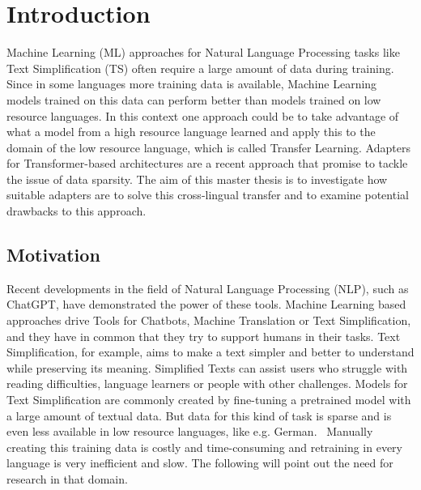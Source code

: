 \section{Introduction}
Machine Learning (ML) approaches for Natural Language Processing tasks like
Text Simplification (TS) often require a large amount of data during training.
Since in some languages more training data is available, Machine Learning models
trained on this data can perform better than models trained on low resource languages.
In this context one approach could be to take advantage of what a model from a high resource
language learned and apply this to the domain of the low resource language, which is
called Transfer Learning.
Adapters for Transformer-based architectures are a recent approach that promise to tackle the issue of data sparsity.
The aim of this master thesis is to investigate how suitable adapters are to solve this cross-lingual transfer
and to examine potential drawbacks to this approach. 

\subsection{Motivation}
Recent developments in the field of Natural Language Processing (NLP), such as ChatGPT, have demonstrated the power of
these tools. Machine Learning based approaches drive Tools for Chatbots, Machine Translation or Text Simplification, and 
they have in common that they try to support humans in their tasks.
Text Simplification, for example, aims to make a text simpler and better to understand while preserving its meaning.
Simplified Texts can assist users who struggle with reading difficulties, language learners or people with other challenges.
Models for Text Simplification are commonly created by fine-tuning a pretrained model with a large amount of textual data.
But data for this kind of task is sparse and is even less available in low resource languages, like e.g. German.~\cite{Rios2021}
Manually creating this training data is costly and time-consuming and retraining in every language is very inefficient and slow.
The following will point out the need for research in that domain.

